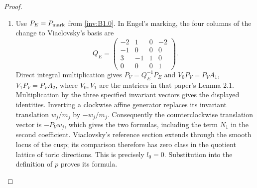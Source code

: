 \begin{proof}
\begin{enumerate}[label=\arabic*.,leftmargin=*]
\item Use $P_E=P_{\rm mark}$ from \cref{inv:B1.0}. In Engel's marking,
the four columns of the change to Viaclovsky's basis are
\[
 Q_E=\begin{pmatrix}-2&1&0&-2\\-1&0&0&0\\3&-1&1&0\\0&0&0&1\end{pmatrix}.
\]
Direct integral multiplication gives $P_V=Q_E^{-1}P_E$ and
$V_0P_V=P_VA_1$, $V_1P_V=P_VA_2$, where $V_0,V_1$ are the
matrices in that paper's Lemma 2.1.  Multiplication by the three
specified invariant vectors gives the displayed identities.
Inverting a clockwise affine generator replaces its invariant
translation $w_j/m_j$ by $-w_j/m_j$.  Consequently the
counterclockwise translation vector is $-P_Vw_j$, which gives the
two formulas, including the term $N_1$ in the second coefficient.  Viaclovsky's reference section extends through
the smooth locus of the cusp; its comparison therefore has zero
class in the quotient lattice of toric directions.  This is precisely
$l_0=0$.  Substitution into the definition of $p$ proves its formula.

\end{enumerate}
\end{proof}